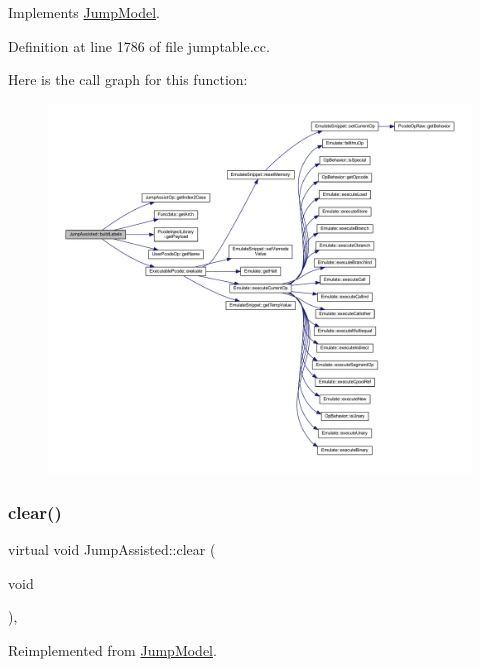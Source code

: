 Implements \mbox{\hyperlink{class_jump_model_af8e7b936b4b51d87b7690693f756ffd6}{Jump\+Model}}.



Definition at line 1786 of file jumptable.\+cc.

Here is the call graph for this function\+:
\nopagebreak
\begin{figure}[H]
\begin{center}
\leavevmode
\includegraphics[width=350pt]{class_jump_assisted_aa8d0c353dd73697469c552b04146efe6_cgraph}
\end{center}
\end{figure}
\mbox{\label{class_jump_assisted_ae3173b13c73cc9c6b8d9451203b3dba0}} 
\subsubsection{\texorpdfstring{clear()}{clear()}}
{\footnotesize\ttfamily virtual void Jump\+Assisted\+::clear (\begin{DoxyParamCaption}\item[{void}]{ }\end{DoxyParamCaption})\hspace{0.3cm}{\ttfamily [inline]}, {\ttfamily [virtual]}}



Reimplemented from \mbox{\hyperlink{class_jump_model_ab733e55fd77fcbafb94269b0dc0f8088}{Jump\+Model}}.



